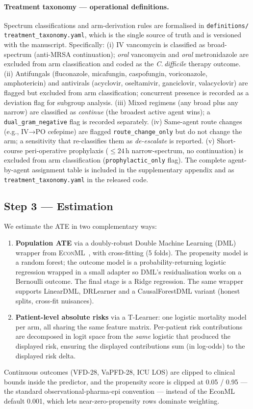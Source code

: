 \documentclass[11pt,a4paper]{article}
\begin{document}
\paragraph{Treatment taxonomy --- operational definitions.} Spectrum classifications and arm-derivation rules are formalised in \texttt{definitions/} \texttt{treatment\_taxonomy.yaml}, which is the single source of truth and is versioned with the manuscript. Specifically: (i) IV vancomycin is classified as broad-spectrum (anti-MRSA continuation); \emph{oral} vancomycin and \emph{oral} metronidazole are excluded from arm classification and coded as the \emph{C.\,difficile} therapy outcome. (ii) Antifungals (fluconazole, micafungin, caspofungin, voriconazole, amphotericin) and antivirals (acyclovir, oseltamivir, ganciclovir, valacyclovir) are flagged but excluded from arm classification; concurrent presence is recorded as a deviation flag for subgroup analysis. (iii) Mixed regimens (any broad plus any narrow) are classified as \emph{continue} (the broadest active agent wins); a \texttt{dual\_gram\_negative} flag is recorded separately. (iv) Same-agent route changes (e.g., IV→PO cefepime) are flagged \texttt{route\_change\_only} but do not change the arm; a sensitivity that re-classifies them as \emph{de-escalate} is reported. (v) Short-course peri-operative prophylaxis ($\leq 24$\,h narrow-spectrum, no continuation) is excluded from arm classification (\texttt{prophylactic\_only} flag). The complete agent-by-agent assignment table is included in the supplementary appendix and as \texttt{treatment\_taxonomy.yaml} in the released code.

\subsection{Step 3 — Estimation}
We estimate the ATE in two complementary ways:
\begin{enumerate}[leftmargin=*,itemsep=2pt]
  \item \textbf{Population ATE} via a doubly-robust Double Machine Learning (DML) wrapper from \textsc{EconML}~\cite{econml}, with cross-fitting (5 folds). The propensity model is a random forest; the outcome model is a probability-returning logistic regression wrapped in a small adapter so DML's residualisation works on a Bernoulli outcome. The final stage is a Ridge regression. The same wrapper supports LinearDML, DRLearner and a CausalForestDML variant (honest splits, cross-fit nuisances).
  \item \textbf{Patient-level absolute risks} via a T-Learner: one logistic mortality model per arm, all sharing the same feature matrix. Per-patient risk contributions are decomposed in logit space from the \emph{same} logistic that produced the displayed risk, ensuring the displayed contributions sum (in log-odds) to the displayed risk delta.
\end{enumerate}
Continuous outcomes (VFD-28, VaPFD-28, ICU LOS) are clipped to clinical bounds inside the predictor, and the propensity score is clipped at 0.05 / 0.95 — the standard observational-pharma-epi convention — instead of the EconML default 0.001, which lets near-zero-propensity rows dominate weighting.
\end{document}
